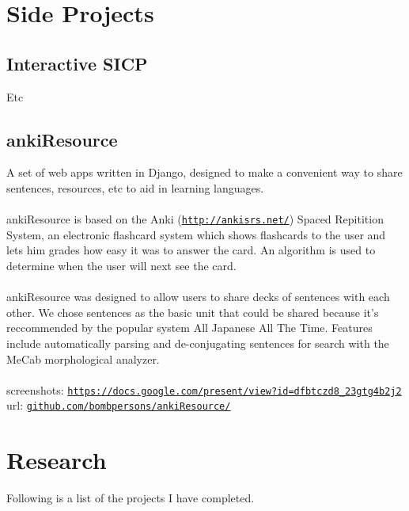 \documentclass[letterpaper]{article}
\begin{document}
\section*{Side Projects}

\subsection*{Interactive SICP}
Etc

\subsection*{ankiResource}
A set of web apps written in Django, designed to make a convenient way to share sentences, resources, etc to aid in learning languages.
\\ \\
ankiResource is based on the Anki (\href{http://ankisrs.net/}{\tt http://ankisrs.net/}) Spaced Repitition System, an electronic flashcard system which shows flashcards to the user and lets him grades how easy it was to answer the card. An algorithm is used to determine when the user will next see the card.
\\ \\
ankiResource was designed to allow users to share decks of sentences with each other. We chose sentences as the basic unit that could be shared because it's reccommended by the popular system All Japanese All The Time. Features include automatically parsing and de-conjugating sentences for search with the MeCab morphological analyzer.
\\ \\
screenshots: \href{https://docs.google.com/present/view?id=dfbtczd8\_23gtg4b2j2}{\tt https://docs.google.com/present/view?id=dfbtczd8\_23gtg4b2j2}
\\
url: \href{https://github.com/bombpersons/ankiResource}{\tt github.com/bombpersons/ankiResource/}

\section*{Research}

Following is a list of the projects I have completed.
\end{document}
